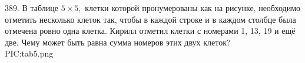 389. В таблице $5\times5,$ клетки которой пронумерованы как на рисунке, необходимо отметить несколько клеток так, чтобы в каждой строке и в каждом столбце была отмечена ровно одна клетка. Кирилл отметил клетки с номерами 1, 13, 19 и ещё две. Чему может быть равна сумма номеров этих двух клеток?\\
{{PIC:tab5.png}}\\
